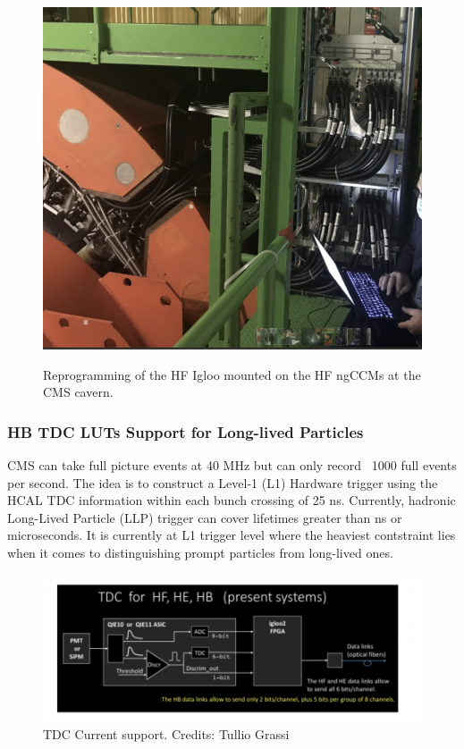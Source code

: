 \begin{figure}[!htbp]
	\centering
    \caption{Reprogramming of the HF Igloo mounted on the HF ngCCMs at the CMS cavern.}
	\includegraphics[scale=0.7]{fig/HFIglooReprogramming.png}
	\label{fig:HFIglooReprogramming}
\end{figure}

\subsubsection{HB TDC LUTs Support for Long-lived Particles}

CMS can take full picture events at 40 MHz but can only record ~1000 full events per second. The idea is to construct a Level-1 (L1) Hardware trigger using the HCAL TDC information within each bunch crossing of 25 ns. Currently, hadronic Long-Lived Particle (LLP) trigger can cover lifetimes greater than ns or microseconds. It is currently at L1 trigger level where the heaviest contstraint lies when it comes to distinguishing prompt particles from long-lived ones. 

\begin{figure}[htbp!]
\caption{TDC Current support. Credits: Tullio Grassi}
\begin{center}
\includegraphics[scale=0.9]{fig/TDCLLP.png}
\end{center}
\label{fig:TDCHBLimits}
\end{figure}

